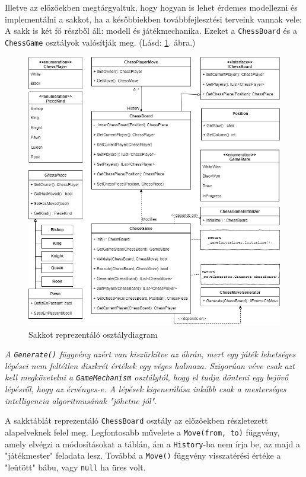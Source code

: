 \documentclass[twoside, a4paper, 12pt]{book}
\begin{document}
Illetve az előzőekben megtárgyaltuk, hogy hogyan is lehet érdemes modellezni és implementálni a sakkot, ha a későbbiekben továbbfejlesztési terveink vannak vele: A sakk is két fő részből áll: modell és játékmechanika. Ezeket a \texttt{ChessBoard} és a \texttt{ChessGame} osztályok valósítják meg. (Lásd: \ref{fig:chessClassDiagram}. ábra.)

\begin{figure}[htbp]
	\centering
	\includegraphics[width=\textwidth]{img/chessClassDiagram.png}
	\caption{Sakkot reprezentáló osztálydiagram}
	\label{fig:chessClassDiagram}
\end{figure}

\textit{A \texttt{Generate()} függvény azért van kiszürkítve az ábrán, mert egy játék lehetséges lépései nem feltétlen diszkrét értékek egy véges halmaza. Szigorúan véve csak azt kell megkövetelni a \texttt{GameMechanism} osztálytól, hogy el tudja dönteni egy bejövő lépésről, hogy az érvényes-e. A lépések kigenerálása inkább csak a mesterséges intelligencia algoritmusának "jöhetne jól".}

A sakktáblát reprezentáló \texttt{ChessBoard} osztály az előzőekben részletezett alapelveknek felel meg. Legfontosabb művelete a \texttt{Move(from, to)} függvény, amely elvégzi a módosításokat a táblán, ám a \texttt{History}-ba nem írja be, az majd a "játékmester" feladata lesz. Továbbá a \texttt{Move()} függvény visszatérési értéke a "leütött" bábu, vagy \texttt{null} ha üres volt.
\end{document}
